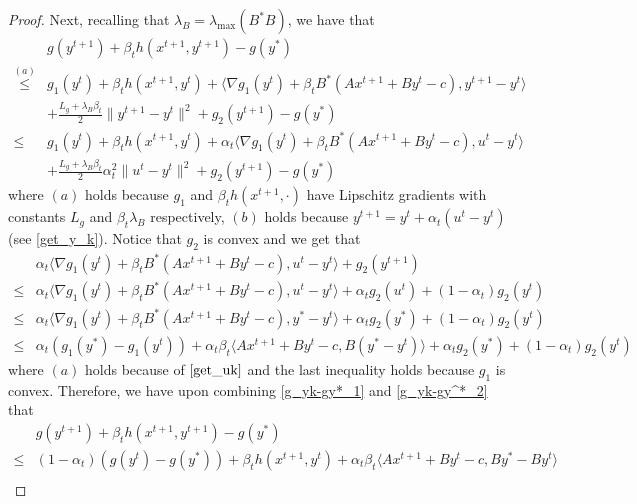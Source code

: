 \documentclass{article}
\numberwithin{equation}{section}
\begin{document}
\begin{proof}
    Next, recalling that $\lambda_{B} = \lambda_{\max}(B^*B)$, we have that 
    \begin{align}
        &g(y^{t+1}) +\beta_{t}h(x^{t+1},y^{t+1}) -g(y^*) \nonumber \\
        \overset{(a)}{\leq} &g_1(y^t) +\beta_{t}h(x^{t+1},y^t)+\langle \nabla g_1(y^t)+\beta_{t}B^*(Ax^{t+1}+By^t-c), y^{t+1} -y^t \rangle \nonumber\\
        &+\frac{L_g +\lambda_{B} \beta_{t}}{2}\|y^{t+1} -y^t\rVert^2 +g_2(y^{t+1}) -g(y^*) \nonumber \\
        \overset{\mathop{(b)}}{\leq}& g_1(y^t)+\beta_{t}h(x^{t+1},y^t) +\alpha_t\langle \nabla g_1(y^t)+\beta_{t}B^*(Ax^{t+1}+By^t-c), u^t -y^t \rangle \nonumber\\
        &+\frac{L_g +\lambda_{B} \beta_{t}}{2}\alpha_t^2\|u^t -y^t\rVert^2 +g_2(y^{t+1}) -g(y^*)
        \label{g_yk-gy*_1}
    \end{align}
    where $(a)$ holds because $g_1$ and $\beta_{t}h(x^{t+1},\cdot)$ have Lipschitz gradients with 
    constants $L_g$ and $\beta_t\lambda_{B}$ respectively, $(b)$ holds because $y^{t+1} = y^t+\alpha_t(u^t-y^t)$ 
    (see \eqref{get_y_k}). 
    Notice that $g_2$ is convex and we get that 
    \begin{align}
        &\alpha_t\langle \nabla g_1(y^t)+\beta_{t}B^*(Ax^{t+1}+By^t-c), u^t -y^t \rangle  +g_2(y^{t+1}) \nonumber \\
        \leq & \alpha_t\langle \nabla g_1(y^t)+\beta_{t}B^*(Ax^{t+1}+By^t-c), u^t -y^t \rangle  +\alpha_tg_2(u^t) +(1-\alpha_t)g_2(y^t) \nonumber \\
        \overset{\mathop{(a)}}{\leq}& \alpha_t\langle \nabla g_1(y^t)+\beta_{t}B^*(Ax^{t+1}+By^t-c), y^* -y^t \rangle  +\alpha_tg_2(y^*) +(1-\alpha_t)g_2(y^t) \nonumber\\
        \leq& \alpha_t(g_1(y^*)-g_1(y^t)) +\alpha_t\beta_t \langle Ax^{t+1}+By^t-c, B(y^* -y^t) \rangle +\alpha_tg_2(y^*) +(1-\alpha_t)g_2(y^t)
        \label{g_yk-gy^*_2}
    \end{align}
    where $(a)$ holds because of $\eqref{get_uk}$ and the last inequality holds because $g_1$ is convex.
    Therefore, we have upon combining \eqref{g_yk-gy*_1} and \eqref{g_yk-gy^*_2} that
    \begin{align}
        &g(y^{t+1}) +\beta_{t}h(x^{t+1},y^{t+1}) -g(y^*) \nonumber \\
        \leq& (1-\alpha_t)(g(y^t)-g(y^*))+\beta_{t}h(x^{t+1},y^t)+ \alpha_t\beta_{t}\langle Ax^{t+1} +By^t -c, By^* -By^t\rangle \nonumber \\

\end{align}
\end{proof}
\end{document}
